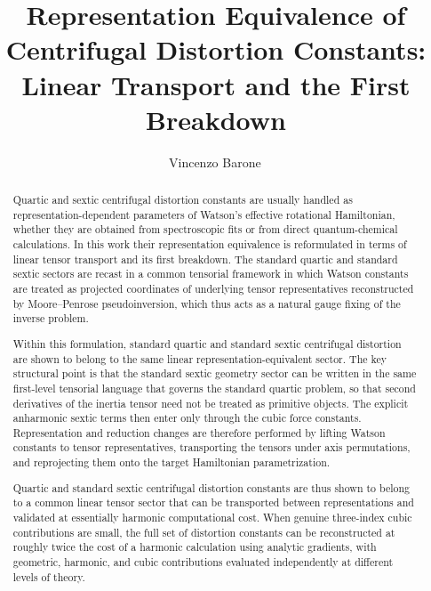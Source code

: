 \documentclass[journal=jacsat,manuscript=article]{achemso}
\title{Representation Equivalence of Centrifugal Distortion Constants: Linear Transport and the First Breakdown}
\author{Vincenzo Barone\,\orcidlink{0000-0001-6420-4107}}
\affiliation[c]{INSTM, via G. Giusti 9, 50121 Firenze, Italy}
\begin{document}
\begin{tocentry}
\end{tocentry}

\begin{abstract}
Quartic and sextic centrifugal distortion constants are usually handled as
representation-dependent parameters of Watson's effective rotational
Hamiltonian, whether they are obtained from spectroscopic fits or from direct
quantum-chemical calculations. In this work their representation equivalence
is reformulated in terms of linear tensor transport and its first breakdown.
The standard quartic and standard sextic sectors are recast in a common
tensorial framework in which Watson constants are treated as projected
coordinates of underlying tensor representatives reconstructed by
Moore--Penrose pseudoinversion, which thus acts as a natural gauge fixing of
the inverse problem.

Within this formulation, standard quartic and standard sextic centrifugal
distortion are shown to belong to the same linear
representation-equivalent sector. The key structural point is that the standard
sextic geometry sector can be written in the same first-level tensorial
language that governs the standard quartic problem, so that second derivatives
of the inertia tensor need not be treated as primitive objects. The explicit
anharmonic sextic terms then enter only through the cubic force constants.
Representation and reduction changes are therefore performed by lifting Watson
constants to tensor representatives, transporting the tensors under axis
permutations, and reprojecting them onto the target Hamiltonian
parametrization.

Quartic and standard sextic centrifugal distortion constants are thus shown to
belong to a common linear tensor sector that can be transported between
representations and validated at essentially harmonic computational cost. When
genuine three-index cubic contributions are small, the full set of distortion
constants can be reconstructed at roughly twice the cost of a harmonic
calculation using analytic gradients, with geometric, harmonic, and cubic
contributions evaluated independently at different levels of theory.


\end{abstract}
\end{document}
